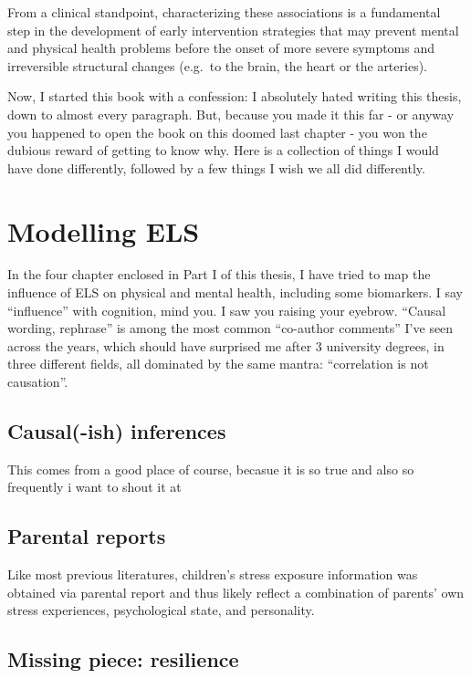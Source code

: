 \documentclass[
  letterpaper,
  DIV=11,
  numbers=noendperiod]{scrreport}
\begin{document}
From a clinical standpoint, characterizing these associations is a
fundamental step in the development of early intervention strategies
that may prevent mental and physical health problems before the onset of
more severe symptoms and irreversible structural changes (e.g.~to the
brain, the heart or the arteries).

Now, I started this book with a confession: I absolutely hated writing
this thesis, down to almost every paragraph. But, because you made it
this far - or anyway you happened to open the book on this doomed last
chapter - you won the dubious reward of getting to know why. Here is a
collection of things I would have done differently, followed by a few
things I wish we all did differently.

\section{Modelling ELS}\label{modelling-els}

In the four chapter enclosed in Part I of this thesis, I have tried to
map the influence of ELS on physical and mental health, including some
biomarkers. I say ``influence'' with cognition, mind you. I saw you
raising your eyebrow. ``Causal wording, rephrase'' is among the most
common ``co-author comments'' I've seen across the years, which should
have surprised me after 3 university degrees, in three different fields,
all dominated by the same mantra: ``correlation is not causation''.

\subsection{Causal(-ish) inferences}\label{causal-ish-inferences}

This comes from a good place of course, becasue it is so true and also
so frequently i want to shout it at

\subsection{Parental reports}\label{parental-reports}

Like most previous literatures, children's stress exposure information
was obtained via parental report and thus likely reflect a combination
of parents' own stress experiences, psychological state, and
personality.

\subsection{Missing piece: resilience}\label{missing-piece-resilience}
\end{document}
